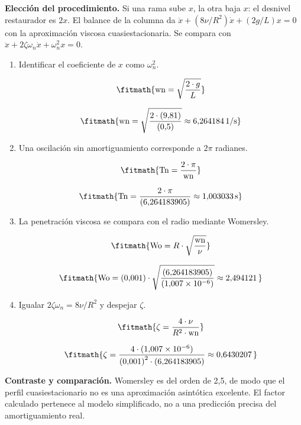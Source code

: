 \noindent\textbf{Elección del procedimiento.} Si una rama sube $x$, la otra baja $x$: el desnivel restaurador es $2x$. El balance de la columna da $\ddot x+(8\nu/R^2)\dot x+(2g/L)x=0$ con la aproximación viscosa cuasiestacionaria. Se compara con $\ddot x+2\zeta\omega_n\dot x+\omega_n^2x=0$.

\begin{enumerate}

\item Identificar el coeficiente de $x$ como $\omega_n^2$.

\[\fitmath{\mathrm{wn}=\sqrt{\frac{2\cdot g}{L}}}\]

\[\fitmath{\mathrm{wn}=\sqrt{\frac{2\cdot (9{,}81)}{(0{,}5)}}\approx 6{,}264184\,\mathrm{1/s}}\]

\item Una oscilación sin amortiguamiento corresponde a $2\pi$ radianes.

\[\fitmath{\mathrm{Tn}=\frac{2\cdot \pi}{\mathrm{wn}}}\]

\[\fitmath{\mathrm{Tn}=\frac{2\cdot \pi}{(6{,}264183905)}\approx 1{,}003033\,\mathrm{s}}\]

\item La penetración viscosa se compara con el radio mediante Womersley.

\[\fitmath{\mathrm{Wo}=R\cdot \sqrt{\frac{\mathrm{wn}}{\nu}}}\]

\[\fitmath{\mathrm{Wo}=(0{,}001)\cdot \sqrt{\frac{(6{,}264183905)}{(1{,}007\times10^{-6})}}\approx 2{,}494121\,}\]

\item Igualar $2\zeta\omega_n=8\nu/R^2$ y despejar $\zeta$.

\[\fitmath{\zeta=\frac{4\cdot \nu}{{R}^{2}\cdot \mathrm{wn}}}\]

\[\fitmath{\zeta=\frac{4\cdot (1{,}007\times10^{-6})}{{(0{,}001)}^{2}\cdot (6{,}264183905)}\approx 0{,}6430207\,}\]

\end{enumerate}

\noindent\textbf{Contraste y comparación.} Womersley es del orden de 2,5, de modo que el perfil cuasiestacionario no es una aproximación asintótica excelente. El factor calculado pertenece al modelo simplificado, no a una predicción precisa del amortiguamiento real.
